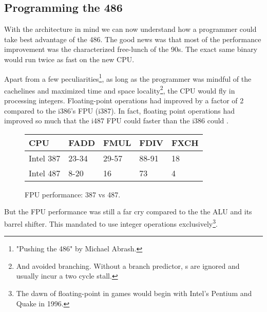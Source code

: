 \subsection{Programming the 486}
With the architecture in mind we can now understand how a programmer could take best advantage of the 486. The good news was that most of the performance improvement was the characterized free-lunch of the 90s. The exact same binary would run twice as fast on the new CPU.\\
\par
Apart from a few peculiarities\footnote{"Pushing the 486" by Michael Abrash.}, as long as the programmer was mindful of the cachelines and maximized time and space locality\footnote{And avoided branching. Without a branch predictor, s are ignored and usually incur a two cycle stall.}, the CPU would fly in processing integers. Floating-point operations had improved by a factor of 2 compared to the i386's FPU (i387). In fact, floating point operations had improved so much that the i487 FPU could  faster than the i386 could .\\
\par
\begin{figure}[H]
\centering
\begin{tabularx}{\textwidth}{ X  X X  X  X}
  \toprule
  \textbf{CPU} & \textbf{FADD} & \textbf{FMUL} & \textbf{FDIV} &\textbf{FXCH} \\ \bottomrule
Intel 387 & 23-34 & 29-57   & 88-91 & 18 \\
Intel 487 & 8-20  & 16   & 73 & 4 \\ \bottomrule
\end{tabularx}
\caption{FPU performance: 387 vs 487.}

\end{figure}

\par
But the FPU performance was still a far cry compared to the the ALU and its barrel shifter. This mandated \doom{} to use integer operations exclusively\footnote{The dawn of floating-point in games would begin with Intel's Pentium and Quake in 1996.}.\\


